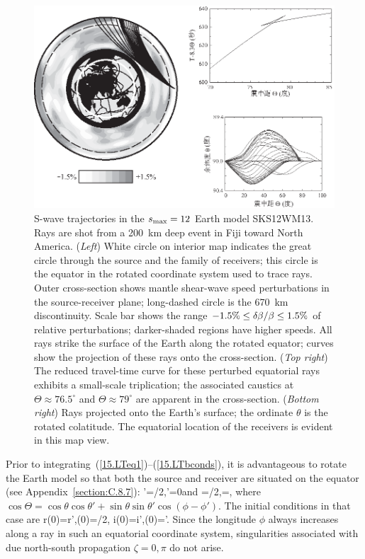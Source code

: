 \begin{figure}[!b]
\begin{center}
\includegraphics{../figures/chap15/fig06.eps}
\end{center}
\caption[liu&tromp Fig 2]
{\label{15.fig.LTfig2}
S-wave trajectories in the $s_{\rm max}=12$ Earth model SKS12WM13.
Rays are shot from a 200~km deep event in Fiji toward North America.
({\em Left\/}) White circle on interior map indicates the
great circle through the source and the family of receivers; this
circle is the equator in the rotated coordinate system used to trace
rays.  Outer cross-section shows mantle shear-wave speed perturbations
in the source-receiver plane; long-dashed circle is the 670~km discontinuity.
Scale bar shows the range $-1.5\%\leq \delta\hspace{-0.1 mm}\beta/\beta\leq
1.5\%$ of relative perturbations; darker-shaded regions have higher speeds.
All rays strike the surface of the Earth along
the rotated equator; curves show the projection of these rays onto the
cross-section.  ({\em Top right}) The reduced travel-time curve for these
perturbed equatorial rays exhibits a small-scale triplication;
the associated caustics
at $\Theta\approx 76.5^{\circ}$ and $\Theta\approx 79^{\circ}$ are apparent
in the cross-section.  ({\em Bottom right}) Rays projected
onto the Earth's surface; the ordinate $\theta$ is the rotated
colatitude.  The equatorial location of the receivers is evident
in this map view.}
\end{figure}
Prior to integrating~(\ref{15.LTeq1})--(\ref{15.LTbconds}),
it is advantageous to rotate the Earth model so that both
the source and receiver are situated on the equator
(see Appendix~\ref{section:C.8.7}):
\eq \label{15.eqrot}
\theta'=\pi/2,\;\phi'=0\quad\mbox{and}\quad
\theta=\pi/2,\;\phi=\Theta,
\en
where $\cos\Theta=\cos\theta\cos\theta'
+\sin\theta\sin\theta'\cos(\phi-\phi')$.
The initial conditions in that case are
\eq
r(0)=r',\qquad\theta(0)=\pi/2,
\qquad i(0)=i',\qquad\zeta(0)=\zeta'.
\label{15.LTb}
\en
Since the longitude $\phi$ always increases along a ray
in such an equatorial coordinate system, singularities
associated with due north-south propagation $\zeta=0,\pi$
do not arise.
%
%

